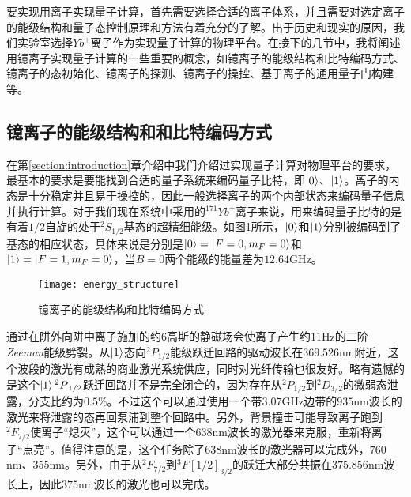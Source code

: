 要实现用离子实现量子计算，首先需要选择合适的离子体系，并且需要对选定离子的能级结构和量子态控制原理和方法有着充分的了解。出于历史和现实的原因，我们实验室选择$Yb^+$离子作为实现量子计算的物理平台。在接下的几节中，我将阐述用镱离子实现量子计算的一些重要的概念，如镱离子的能级结构和比特编码方式、镱离子的态初始化、镱离子的探测、镱离子的操控、基于离子的通用量子门构建等。


\subsection[镱离子的能级结构和和比特编码方式]{镱离子的能级结构和和比特编码方式}
在第\ref{section:introduction}章介绍中我们介绍过实现量子计算对物理平台的要求，最基本的要求是要能找到合适的量子系统来编码量子比特，即$\ket{0}$、$\ket{1}$。离子的内态是十分稳定并且易于操控的，因此一般选择离子的两个内部状态来编码量子信息并执行计算。对于我们现在系统中采用的$^{171}Yb^+$离子来说，用来编码量子比特的是有着$1/2$自旋的处于$^2S_{1/2}$基态的超精细能级\cite[]{Olmschenk_Younge_Moehring_Matsukevich_Maunz_Monroe_2007}。如图\ref{fig:energy_structure}所示，$\ket{0}$和$\ket{1}$分别被编码到了基态的相应状态，具体来说是分别是$\ket{0}=\ket{F=0,m_F=0}$和$\ket{1}=\ket{F=1,m_F=0}$，当$B=0$两个能级的能量差为$12.64$GHz。

\begin{figure}
    \centering
    \caption[镱离子的能级结构和比特编码方式]{镱离子的能级结构和比特编码方式\label{fig:energy_structure}}
    \texttt{[image: energy\_structure]}
\end{figure}

通过在阱外向阱中离子施加的约$6$高斯的静磁场会使离子产生约$11$Hz的二阶\emph{Zeeman}能级劈裂。从$\ket{1}$态向$^2P_{1/2}$能级跃迁回路的驱动波长在$369.526$nm附近，这个波段的激光有成熟的商业激光系统供应，同时对光纤传输也很友好。略有遗憾的是这个$\ket{1}{^2P}_{1/2}$跃迁回路并不是完全闭合的，因为存在从$^2P_{1/2}$到$^2D_{3/2}$的微弱态泄露，分支比约为$0.5$\%\cite[]{Olmschenk_Younge_Moehring_Matsukevich_Maunz_Monroe_2007}。不过这个可以通过使用一个带$3.07$GHz边带的$935$nm波长的激光来将泄露的态再回泵浦到整个回路中。另外，背景撞击可能导致离子跑到$^2F_{7/2}$使离子“熄灭”，这个可以通过一个$638$nm波长的激光器来克服，重新将离子“点亮”。值得注意的是，这个任务除了$638$nm波长的激光器可以完成外，$760$nm\cite[]{Huntemann_Okhapkin_Lipphardt_Weyers_Tamm_Peik_2012}、$355$nm\cite[]{Senko_2014}。另外，由于从$^2F_{7/2}$到$^3F[1/2]_{3/2}$的跃迁大部分共振在$375.856$nm波长上，因此$375$nm波长的激光也可以完成。

